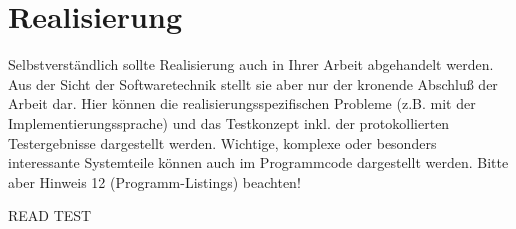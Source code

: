\chapter{Realisierung}\label{chp:realisierung}
Selbstverständlich sollte Realisierung auch in Ihrer Arbeit abgehandelt werden. Aus der Sicht der Softwaretechnik stellt sie aber nur der kronende Abschluß der Arbeit dar. Hier können die realisierungsspezifischen Probleme (z.B. mit der Implementierungssprache) und das Testkonzept inkl. der protokollierten Testergebnisse dargestellt werden. Wichtige, komplexe oder besonders interessante Systemteile können auch im Programmcode dargestellt werden. Bitte aber Hinweis 12 (Programm-Listings) beachten!



READ
TEST
